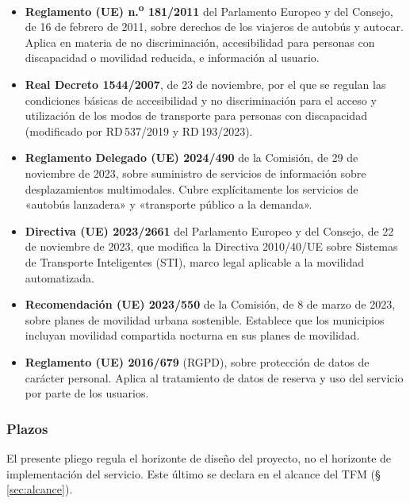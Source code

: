 \begin{itemize}
  \item \textbf{Reglamento (UE) n.\textsuperscript{o} 181/2011} del
        Parlamento Europeo y del Consejo, de 16 de febrero de 2011,
        sobre derechos de los viajeros de autobús y autocar. Aplica
        en materia de no discriminación, accesibilidad para personas
        con discapacidad o movilidad reducida, e información al
        usuario.
  \item \textbf{Real Decreto 1544/2007}, de 23 de noviembre, por el
        que se regulan las condiciones básicas de accesibilidad y no
        discriminación para el acceso y utilización de los modos de
        transporte para personas con discapacidad (modificado por
        RD\,537/2019 y RD\,193/2023).
  \item \textbf{Reglamento Delegado (UE) 2024/490} de la Comisión,
        de 29 de noviembre de 2023, sobre suministro de servicios de
        información sobre desplazamientos multimodales. Cubre
        explícitamente los servicios de «autobús lanzadera» y
        «transporte público a la demanda».
  \item \textbf{Directiva (UE) 2023/2661} del Parlamento Europeo
        y del Consejo, de 22 de noviembre de 2023, que modifica
        la Directiva 2010/40/UE sobre Sistemas de Transporte
        Inteligentes (STI), marco legal aplicable a la movilidad
        automatizada.
  \item \textbf{Recomendación (UE) 2023/550} de la Comisión, de
        8 de marzo de 2023, sobre planes de movilidad urbana
        sostenible. Establece que los municipios incluyan movilidad
        compartida nocturna en sus planes de movilidad.
  \item \textbf{Reglamento (UE) 2016/679} (RGPD), sobre protección
        de datos de carácter personal. Aplica al tratamiento de datos
        de reserva y uso del servicio por parte de los usuarios.
\end{itemize}


\subsubsection{Plazos}
\label{sec:pliego-plazos}

El presente pliego regula el horizonte de diseño del proyecto, no el
horizonte de implementación del servicio. Este último se declara en
el alcance del \acs{TFM} (§\,\ref{sec:alcance}).

